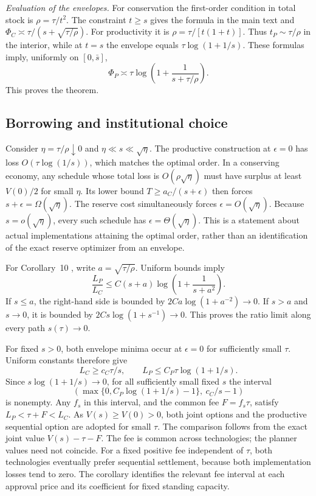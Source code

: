 \documentclass[ecta,draft,supplement]{econsocart}
\theoremstyle{definition}
\theoremstyle{definition}
\begin{document}
\begin{appendix}
\emph{Evaluation of the envelopes.}
For conservation the first-order condition in total stock is
$\rho=\tau/t^2$. The constraint $t\geq s$ gives the formula
in the main text and
$\Phi_C\asymp\tau/(s+\sqrt{\tau/\rho})$.
For productivity it is $\rho=\tau/[t(1+t)]$.
Thus $t_P\sim\tau/\rho$ in the interior, while at $t=s$
the envelope equals $\tau\log(1+1/s)$.
These formulas imply, uniformly on $[0,\bar s]$,
\[
 \Phi_P\asymp
 \tau\log\left(1+\frac1{s+\tau/\rho}\right).
\]
This proves the theorem.

\subsection{Borrowing and institutional choice}

Consider $\eta=\tau/\rho\downarrow0$ and
$\eta\ll s\ll\sqrt\eta$. The productive construction at
$\epsilon=0$ has loss $O(\tau\log(1/s))$, which matches the
optimal order. In a conserving economy, any schedule whose total
loss is $O(\rho\sqrt\eta)$ must have surplus at least $V(0)/2$
for small $\eta$. Its lower bound $T\geq a_C/(s+\epsilon)$
then forces $s+\epsilon=\Omega(\sqrt\eta)$. The reserve cost
simultaneously forces $\epsilon=O(\sqrt\eta)$.
Because $s=o(\sqrt\eta)$, every such schedule has
$\epsilon=\Theta(\sqrt\eta)$. This is a statement about
actual implementations attaining the optimal order, rather than
an identification of the exact reserve optimizer from an envelope.

For Corollary~10%
, write
$a=\sqrt{\tau/\rho}$. Uniform bounds imply
\[
 \frac{L_P}{L_C}
 \leq C(s+a)\log\left(1+\frac1{s+a^2}\right).
\]
If $s\leq a$, the right-hand side is bounded by
$2Ca\log(1+a^{-2})\to0$. If $s>a$ and $s\to0$, it is
bounded by $2Cs\log(1+s^{-1})\to0$.
This proves the ratio limit along every path $s(\tau)\to0$.

For fixed $s>0$, both envelope minima occur at $\epsilon=0$
for sufficiently small $\tau$. Uniform constants therefore give
\[
 L_C\geq c_C\tau/s,
 \qquad L_P\leq C_P\tau\log(1+1/s).
\]
Since $s\log(1+1/s)\to0$, for all sufficiently small fixed
$s$ the interval
\[
 \left(\max\{0,C_P\log(1+1/s)-1\},\ c_C/s-1\right)
\]
is nonempty. Any $f_s$ in this interval, and the common fee
$F=f_s\tau$, satisfy
$L_P<\tau+F<L_C$. As $V(s)\geq V(0)>0$, both joint
options and the productive sequential option are adopted for
small $\tau$. The comparison follows from the exact joint
value $V(s)-\tau-F$. The fee is common across technologies;
the planner values need not coincide. For a fixed positive fee
independent of $\tau$, both technologies eventually prefer
sequential settlement, because both implementation losses tend
to zero. The corollary identifies the relevant fee interval at
each approval price and its coefficient for fixed standing capacity.


\end{appendix}
\end{document}
